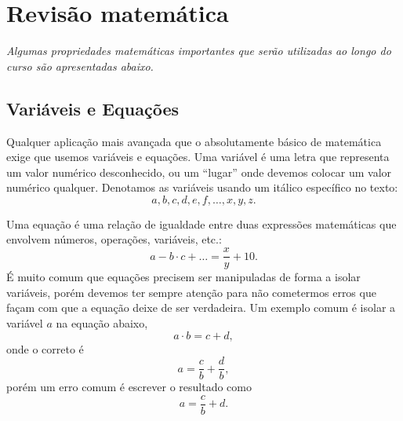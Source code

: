 \chapter{Revisão matemática}
\label{Chap:Review}

\begin{fullwidth}
{\it
Algumas propriedades matemáticas importantes que serão utilizadas ao longo do curso são apresentadas abaixo.
}
\end{fullwidth}

\section{Variáveis e Equações}

Qualquer aplicação mais avançada que o absolutamente básico de matemática exige que usemos variáveis e equações. Uma variável é uma letra que representa um valor numérico desconhecido, ou um ``lugar'' onde devemos colocar um valor numérico qualquer. Denotamos as variáveis usando um itálico específico no texto:
\begin{displaymath}
    a, b, c, d, e, f, \dots, x, y, z.
\end{displaymath}

Uma equação é uma relação de igualdade entre duas expressões matemáticas que envolvem números, operações, variáveis, etc.:
\begin{equation}
    a - b \cdot c + \dots = \frac{x}{y} + 10.
\end{equation}
%
É muito comum que equações precisem ser manipuladas de forma a isolar variáveis, porém devemos ter sempre atenção para não cometermos erros que façam com que a equação deixe de ser verdadeira. Um exemplo comum é isolar a variável $a$ na equação abaixo,
\begin{equation}
    a \cdot b = c + d,
\end{equation}
%
onde o correto é
\begin{equation}
    a = \frac{c}{b} + \frac{d}{b},
\end{equation}
%
porém um erro comum é escrever o resultado como
\begin{equation}
    a = \frac{c}{b} + d.
\end{equation}

